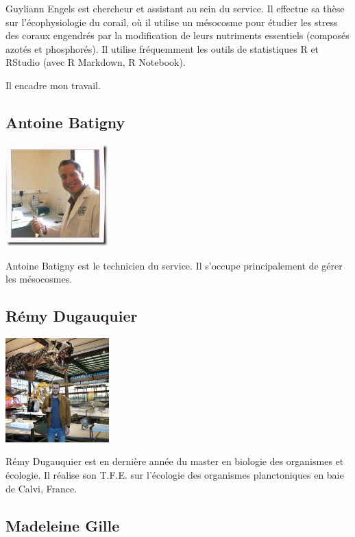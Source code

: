 \documentclass[]{report}
\begin{document}
Guyliann Engels est chercheur et assistant au sein du service. Il
effectue sa thèse sur l'écophysiologie du corail, où il utilise un
mésocosme pour étudier les stress des coraux engendrés par la
modification de leurs nutriments essentiels (composés azotés et
phosphorés). Il utilise fréquemment les outils de statistiques R et
RStudio (avec R Markdown, R Notebook).

Il encadre mon travail.

\subsection{Antoine Batigny}\label{antoine-batigny}

\includegraphics[width=4.00000cm]{../image/antoine2.jpg}

Antoine Batigny est le technicien du service. Il s'occupe principalement
de gérer les mésocosmes.

\subsection{Rémy Dugauquier}\label{remy-dugauquier}

\includegraphics[width=4.00000cm]{../image/remy.jpg}

Rémy Dugauquier est en dernière année du master en biologie des
organismes et écologie. Il réalise son T.F.E. sur l'écologie des
organismes planctoniques en baie de Calvi, France.

\subsection{Madeleine Gille}\label{madeleine-gille}
\end{document}
